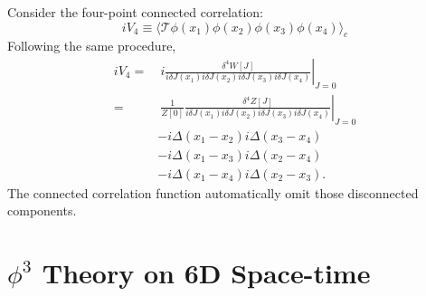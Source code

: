 \begin{framedexpl}
Consider the four-point connected correlation:
\begin{equation*}
	iV_4 \equiv \langle \mathcal{T}\phi(x_1) \phi(x_2) \phi(x_3) \phi(x_4)\rangle_c
\end{equation*}
Following the same procedure,
\begin{equation*}
\begin{aligned}
	iV_4 
	=&\ i\left.\frac{\delta^4 W[J]}{i\delta J(x_1)i\delta J(x_2)i\delta J(x_3)i\delta J(x_4)}\right|_{J=0} \\
	=&\ \frac{1}{Z[0]}\left.\frac{\delta^4 Z[J]}{i\delta J(x_1)i\delta J(x_2)i\delta J(x_3)i\delta J(x_4)}\right|_{J=0} \\
	& -i\Delta(x_1-x_2) i\Delta(x_3-x_4) \\
	& -i\Delta(x_1-x_3) i\Delta(x_2-x_4) \\
	& -i\Delta(x_1-x_4) i\Delta(x_2-x_3).
\end{aligned}
\end{equation*}
The connected correlation function automatically omit those disconnected components.
\end{framedexpl}




\section{$\phi^3$ Theory on 6D Space-time}

